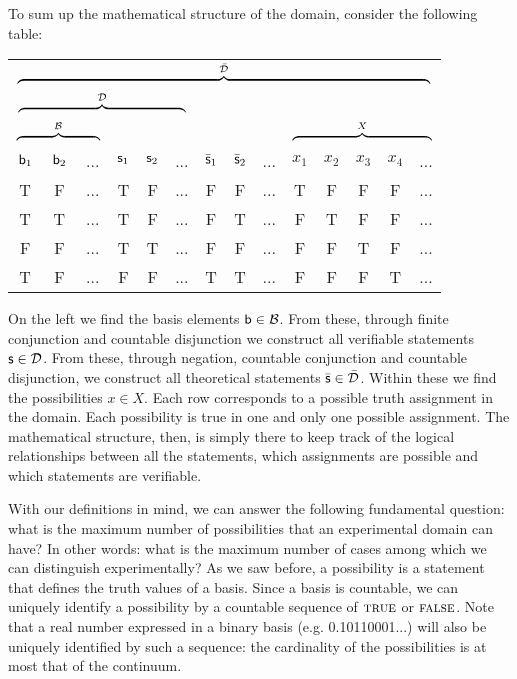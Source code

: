 \documentclass[11pt,letterpaper,fleqn]{memoir} %
\begin{document}
To sum up the mathematical structure of the domain, consider the following table:
\begin{center}
	\begin{tabular}{c|c|c|c|c|c|c|c|c|c|c|c|c|c}
		\multicolumn{14}{c}{$\overbrace{\rule{10.4cm}{0pt}}^{\tdomain}$} \\		\multicolumn{6}{c|}{$\overbrace{\rule{4.2cm}{0pt}}^{\edomain}$} & \multicolumn{6}{c}{}  \\		\multicolumn{3}{c|}{$\overbrace{\rule{2.1cm}{0pt}}^{\basis}$} & \multicolumn{3}{c|}{} & \multicolumn{3}{c|}{} & \multicolumn{5}{c}{$\overbrace{\rule{3.5cm}{0pt}}^{X}$} \\
		$\stmt[b]_1$ & $\stmt[b]_2$ & ... & $\stmt_1$ & $\stmt_2$ & ... & $\bar{\stmt}_1$ & $\bar{\stmt}_2$ & ... & $x_1$ & $x_2$ & $x_3$ &$x_4$ & ... \\
		\hline
		T & F & ... & T & F & ... & F & F & ... & T & F & F & F & ... \\
		T & T & ... & T & F & ... & F & T & ... & F & T & F & F & ... \\
		F & F & ... & T & T & ... & F & F & ... & F & F & T & F & ... \\
		T & F & ... & F & F & ... & T & T & ... & F & F & F & T & ... \\
	\end{tabular}
\end{center}
On the left we find the basis elements $\stmt[b] \in \basis$. From these, through finite conjunction and countable disjunction we construct all verifiable statements $\stmt \in \edomain$. From these, through negation, countable conjunction and countable disjunction, we construct all theoretical statements $\bar{\stmt} \in \tdomain$. Within these we find the possibilities $x \in X$. Each row corresponds to a possible truth assignment in the domain. Each possibility is true in one and only one possible assignment. The mathematical structure, then, is simply there to keep track of the logical relationships between all the statements, which assignments are possible and which statements are verifiable.

With our definitions in mind, we can answer the following fundamental question: what is the maximum number of possibilities that an experimental domain can have? In other words: what is the maximum number of cases among which we can distinguish experimentally? As we saw before, a possibility is a statement that defines the truth values of a basis. Since a basis is countable, we can uniquely identify a possibility by a countable sequence of $\TRUE$ or $\FALSE$. Note that a real number expressed in a binary basis (e.g. 0.10110001...) will also be uniquely identified by such a sequence: the cardinality of the possibilities is at most that of the continuum.
\end{document}
